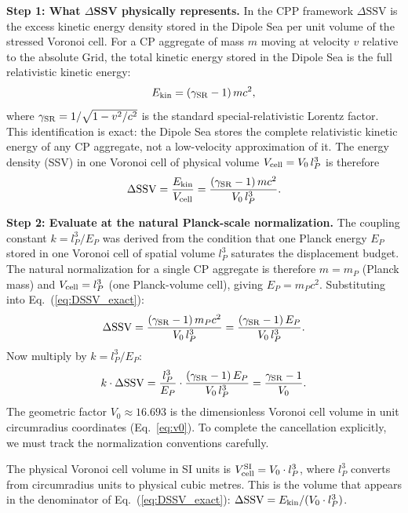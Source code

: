 \documentclass[11pt,letterpaper]{article}
\begin{document}
\textbf{Step 1: What $\Delta$SSV physically represents.}
In the CPP framework $\Delta\text{SSV}$ is the excess kinetic energy density stored in the Dipole Sea per unit volume of the stressed Voronoi cell. For a CP aggregate of mass $m$ moving at velocity $v$ relative to the absolute Grid, the total kinetic energy stored in the Dipole Sea is the full relativistic kinetic energy:
\begin{equation}
E_{\rm kin} = (\gamma_{\rm SR} - 1)\,mc^2,
\label{eq:Ekin_SR}
\end{equation}
where $\gamma_{\rm SR} = 1/\sqrt{1-v^2/c^2}$ is the standard 
special-relativistic Lorentz factor. This identification is exact: the Dipole Sea stores the complete relativistic kinetic energy of any CP aggregate, not a low-velocity approximation of it. The energy density (SSV) in one Voronoi cell of physical volume $V_{\rm cell} = V_0\,l_P^3$ is therefore
\begin{equation}
\Delta\text{SSV} = \frac{E_{\rm kin}}{V_{\rm cell}} 
= \frac{(\gamma_{\rm SR}-1)\,mc^2}{V_0\,l_P^3}.
\label{eq:DSSV_exact}
\end{equation}

\textbf{Step 2: Evaluate at the natural Planck-scale normalization.}
The coupling constant $k = l_P^3/E_P$ was derived from the condition that one Planck energy $E_P$ stored in one Voronoi cell of spatial volume $l_P^3$ saturates the displacement budget. The natural normalization for a single CP aggregate is therefore $m = m_P$ (Planck mass) and $V_{\rm cell} = l_P^3$ (one Planck-volume cell), giving $E_P = m_P c^2$. Substituting into Eq.~(\ref{eq:DSSV_exact}):
\begin{equation}
\Delta\text{SSV} = \frac{(\gamma_{\rm SR}-1)\,m_P c^2}{V_0\,l_P^3} = \frac{(\gamma_{\rm SR}-1)\,E_P}{V_0\,l_P^3}.
\label{eq:DSSV_planck}
\end{equation}
Now multiply by $k = l_P^3/E_P$:
\begin{equation}
k\cdot\Delta\text{SSV} = \frac{l_P^3}{E_P} \cdot 
\frac{(\gamma_{\rm SR}-1)\,E_P}{V_0\,l_P^3} 
= \frac{\gamma_{\rm SR}-1}{V_0}.
\label{eq:k_DSSV}
\end{equation}
The geometric factor $V_0 \approx 16.693$ is the dimensionless Voronoi cell volume in unit circumradius coordinates (Eq.~\ref{eq:v0}). To complete the cancellation explicitly, we must track the normalization conventions carefully.

The physical Voronoi cell volume in SI units is $V_{\rm cell}^{\rm SI} = V_0 \cdot l_P^3$, where $l_P^3$ converts from circumradius units to physical cubic metres. This is the volume that appears in the denominator of Eq.~(\ref{eq:DSSV_exact}): 
$\Delta\text{SSV} = E_{\rm kin}/(V_0 \cdot l_P^3)$.
\end{document}
